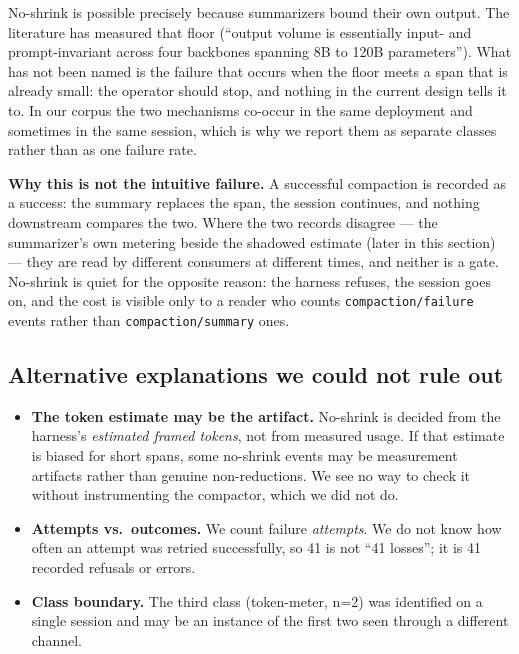 \documentclass[
]{article}
\providecommand{\tightlist}{%
  \setlength{\itemsep}{0pt}\setlength{\parskip}{0pt}}
\begin{document}
No-shrink is possible precisely because summarizers bound their own
output. The literature has measured that floor (``output volume is
essentially input- and prompt-invariant across four backbones spanning
8B to 120B parameters''). What has not been named is the failure that
occurs when the floor meets a span that is already small: the operator
should stop, and nothing in the current design tells it to. In our
corpus the two mechanisms co-occur in the same deployment and sometimes
in the same session, which is why we report them as separate classes
rather than as one failure rate.

\textbf{Why this is not the intuitive failure.} A successful compaction
is recorded as a success: the summary replaces the span, the session
continues, and nothing downstream compares the two. Where the two
records disagree --- the summarizer's own metering beside the shadowed
estimate (later in this section) --- they are read by different
consumers at different times, and neither is a gate. No-shrink is quiet
for the opposite reason: the harness refuses, the session goes on, and
the cost is visible only to a reader who counts
\texttt{compaction/failure} events rather than
\texttt{compaction/summary} ones.

\subsection{Alternative explanations we could not rule
out}\label{alternative-explanations-we-could-not-rule-out}

\begin{itemize}
\tightlist
\item
  \textbf{The token estimate may be the artifact.} No-shrink is decided
  from the harness's \emph{estimated framed tokens}, not from measured
  usage. If that estimate is biased for short spans, some no-shrink
  events may be measurement artifacts rather than genuine
  non-reductions. We see no way to check it without instrumenting the
  compactor, which we did not do.
\item
  \textbf{Attempts vs.~outcomes.} We count failure \emph{attempts}. We
  do not know how often an attempt was retried successfully, so 41 is
  not ``41 losses''; it is 41 recorded refusals or errors.
\item
  \textbf{Class boundary.} The third class (token-meter, n=2) was
  identified on a single session and may be an instance of the first two
  seen through a different channel.
\end{itemize}
\end{document}
